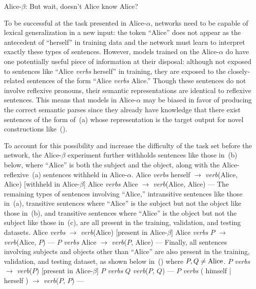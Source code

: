 \ssec Alice-$\beta$: But wait, doesn't Alice know Alice?

To be successful at the task presented in Alice-$\alpha$, networks need to be
capable of lexical generalization in a new input: the token ``Alice'' does not
appear as the antecedent of ``herself'' in training data and the network must
learn to interpret exactly these types of sentences. However, models trained
on the Alice-$\alpha$ do have one potentially useful piece of information at
their disposal: although not exposed to sentences like ``Alice {\em verbs} 
herself'' in training, they are exposed to the closely-related sentences of
the form ``Alice {\em verbs} Alice.'' Though these sentences do not involve
reflexive pronouns, their semantic representations are identical to reflexive
sentences. This means that models in Alice-$\alpha$ may be biased in favor of
producing the correct semantic parses since they already have knowledge that
there exist sentences of the form of~(a) whose
representation is the target output for novel constructions like~().

To account for this possibility and increase the difficulty of the task set 
before the network, the Alice-$\beta$ experiment further withholds sentences
like those in~(\nextx b) below, where ``Alice'' is both the subject and the
object, along with the Alice-reflexive~(\nextx a) sentences withheld in 
Alice-$\alpha$.
	\a Alice {\em verbs} herself $\to$ {\em verb}(Alice, Alice) \hfill [withheld in Alice-$\beta$]
	\a Alice {\em verbs} Alice $\to$ {\em verb}(Alice, Alice) \hfill  ---
\xe
The remaining types of sentences involving ``Alice,'' intransitive sentences 
like those in~(\nextx a), transitive sentences where ``Alice'' is the subject
but not the object like those in~(\nextx b), and transitive sentences where 
``Alice'' is the object but not the subject like those in~(\nextx c), are all
present in the training, validation, and testing datasets.
\pex
	\a Alice {\em verbs} $\to$ {\em verb}(Alice) \hfill [present in Alice-$\beta$]
	\a Alice {\em verbs} $P$ $\to$ {\em verb}(Alice, $P$) \hfill ---
	\a $P$ {\em verbs} Alice $\to$ {\em verb}($P$, Alice) \hfill ---
\xe
Finally, all sentences involving subjects and objects other than ``Alice'' are 
also present in the training, validation, and testing dataset, as shown below
in~(\nextx) where $P,Q \not= \hbox{Alice}$.
\pex
	\a $P$ {\em verbs} $\to$ {\em verb}($P$) \hfill [present in Alice-$\beta$]
	\a $P$ {\em verbs} $Q$ {\em verb}($P$, $Q$) \hfill ---
	\a $P$ {\em verbs} ( himself | herself ) $\to$ {\em verb}($P$, $P$) \hfill ---
\xe

